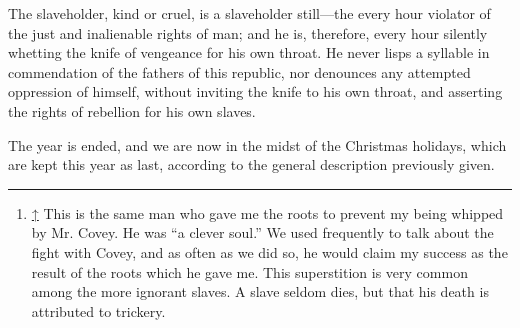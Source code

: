 The slaveholder, kind or cruel, is a slaveholder still---the every hour
violator of the just and inalienable rights of man; and he is,
therefore, every hour silently whetting the knife of vengeance for his
own throat. He never lisps a syllable in commendation of the fathers of
this republic, nor denounces any attempted oppression of himself,
without inviting the knife to his {\protect\hypertarget{270}{}{}}own
throat, and asserting the rights of rebellion for his own slaves.

The year is ended, and we are now in the midst of the Christmas
holidays, which are kept this year as last, according to the general
description previously given.

\begin{center}\rule{0.5\linewidth}{\linethickness}\end{center}

\begin{enumerate}
\item
  \hypertarget{cite_note-1}{}

  {\protect\hyperlink{cite_ref-1}{↑}} {This is the same man who gave me
  the roots to prevent my being whipped by Mr. Covey. He was ``a clever
  soul.'' We used frequently to talk about the fight with Covey, and as
  often as we did so, he would claim my success as the result of the
  roots which he gave me. This superstition is very common among the
  more ignorant slaves. A slave seldom dies, but that his death is
  attributed to trickery.}
\end{enumerate}
